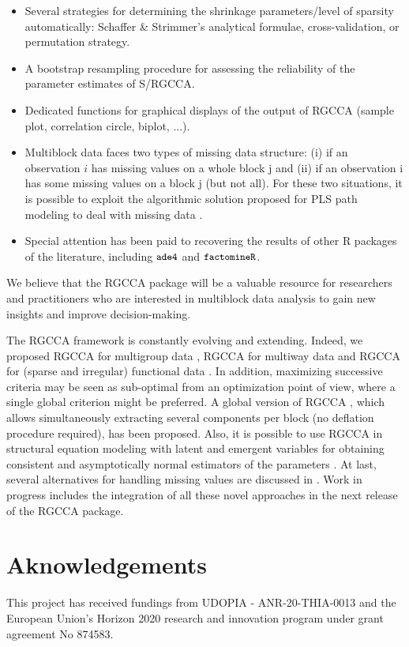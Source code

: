 \documentclass[
]{jss}
\begin{document}
\begin{itemize}
\item Several strategies for determining the shrinkage 
parameters/level of sparsity automatically: Schaffer \& Strimmer's analytical formulae,  
cross-validation, or permutation strategy.

\item A bootstrap resampling procedure for assessing the reliability of the 
parameter estimates of S/RGCCA.

\item Dedicated functions for graphical displays of the output of RGCCA 
(sample plot, correlation circle, biplot, ...).

\item Multiblock data faces two types of missing data structure: (i) if an 
observation $i$ has missing values on a whole block j and (ii) if an 
observation i has some missing values on a block j (but not all). For these two 
situations, it is possible to exploit the algorithmic solution proposed for PLS 
path modeling to deal with missing data \citep[see][]{Tenenhaus2005}.

\item Special attention has been paid to recovering the results of other R packages 
of the literature, including $\small{\texttt{ade4}}$ and 
$\small{\texttt{factomineR}}$.
\end{itemize}

We believe that the RGCCA package will be a valuable resource for
researchers and practitioners who are interested in multiblock data
analysis to gain new insights and improve decision-making.

The RGCCA framework is constantly evolving and extending. Indeed, we
proposed RGCCA for multigroup data \citep{Tenenhaus2014b}, RGCCA for
multiway data \citep{Gloaguen2020, Girka2023} and RGCCA for (sparse and
irregular) functional data \citep{Sort2023}. In addition, maximizing
successive criteria may be seen as sub-optimal from an optimization
point of view, where a single global criterion might be preferred. A
global version of RGCCA \citep{Gloaguen2020b}, which allows
simultaneously extracting several components per block (no deflation
procedure required), has been proposed. Also, it is possible to use
RGCCA in structural equation modeling with latent and emergent variables
for obtaining consistent and asymptotically normal estimators of the
parameters \citep{Tenenhaus2023}. At last, several alternatives for
handling missing values are discussed in \cite{Peltier2022}. Work in
progress includes the integration of all these novel approaches in the
next release of the RGCCA package.

\hypertarget{aknowledgements}{%
\section*{Aknowledgements}\label{aknowledgements}}

This project has received fundings from UDOPIA - ANR-20-THIA-0013 and
the European Union's Horizon 2020 research and innovation program under
grant agreement No 874583.

\renewcommand\refname{References}

\end{document}
